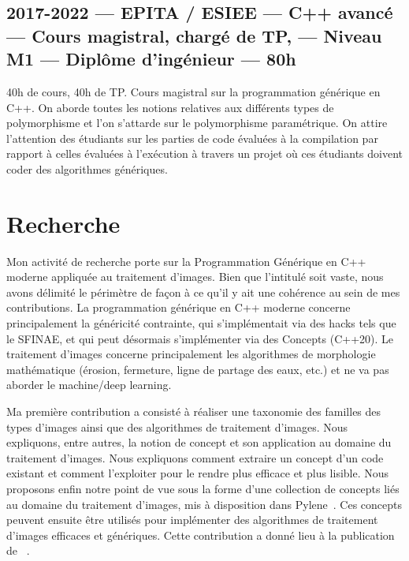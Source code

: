 \documentclass[11pt,a4paper,sans]{article} %
\begin{document}
\subsection{2017-2022 --- EPITA / ESIEE --- C++ avancé --- Cours magistral, chargé de TP, --- Niveau M1 --- Diplôme
  d'ingénieur --- 80h}

40h de cours, 40h de TP. Cours magistral sur la programmation générique en C++. On aborde toutes les notions relatives
aux différents types de polymorphisme et l'on s'attarde sur le polymorphisme paramétrique. On attire l'attention des
étudiants sur les parties de code évaluées à la compilation par rapport à celles évaluées à l'exécution à travers un
projet où ces étudiants doivent coder des algorithmes génériques.

\clearpage

\section{Recherche}

Mon activité de recherche porte sur la Programmation Générique en C++ moderne appliquée au traitement d'images. Bien que
l'intitulé soit vaste, nous avons délimité le périmètre de façon à ce qu'il y ait une cohérence au sein de mes
contributions. La programmation générique en C++ moderne concerne principalement la généricité contrainte, qui
s'implémentait via des hacks tels que le SFINAE, et qui peut désormais s'implémenter via des Concepts (C++20). Le
traitement d'images concerne principalement les algorithmes de morphologie mathématique (érosion, fermeture, ligne de
partage des eaux, etc.) et ne va pas aborder le machine/deep learning.

Ma première contribution a consisté à réaliser une taxonomie des familles des types d'images ainsi que des algorithmes
de traitement d'images. Nous expliquons, entre autres, la notion de concept et son application au domaine du traitement
d'images. Nous expliquons comment extraire un concept d'un code existant et comment l'exploiter pour le rendre plus
efficace et plus lisible. Nous proposons enfin notre point de vue sous la forme d'une collection de concepts liés au
domaine du traitement d'images, mis à disposition dans Pylene~\parencite{carlinet.2018.pylene}. Ces concepts peuvent
ensuite être utilisés pour implémenter des algorithmes de traitement d'images efficaces et génériques. Cette
contribution a donné lieu à la publication de ~\parencite{roynard.2019.rrpr}.
\end{document}
